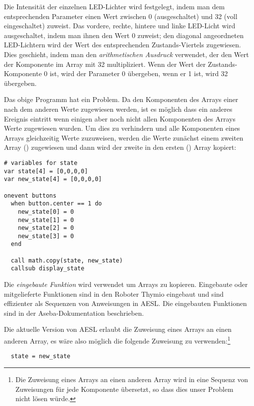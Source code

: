 Die Intensität der einzelnen LED-Lichter wird festgelegt, indem man dem entsprechenden Parameter einen Wert zwischen 0 (ausgeschaltet) und 32 (voll eingeschaltet) zuweist. Das vordere, rechte, hintere und linke LED-Licht wird ausgeschaltet, indem man ihnen den Wert 0 zuweist; den diagonal angeordneten LED-Lichtern wird der Wert des entsprechenden Zustands-Viertels zugewiesen. Dies geschieht, indem man den \emph{arithmetischen Ausdruck}  verwendet, der den Wert der Komponente im Array mit 32 multipliziert. Wenn der Wert der Zustands-Komponente 0 ist, wird der Parameter 0 übergeben, wenn er 1 ist, wird 32 übergeben. 

\newpage


Das obige Programm hat ein Problem. Da den Komponenten des Arrays  einer nach dem anderen Werte zugewiesen werden, ist es möglich dass ein anderes Ereignis eintritt wenn einigen aber noch nicht allen Komponenten des Arrays Werte zugewiesen wurden. Um dies zu verhindern und alle Komponenten eines Arrays gleichzeitig Werte zuzuweisen, werden die Werte zunächst einem zweiten Array () zugewiesen und dann wird der zweite in den ersten () Array kopiert:

\begin{footnotesize}
\begin{verbatim}
# variables for state
var state[4] = [0,0,0,0]
var new_state[4] = [0,0,0,0]

onevent buttons
  when button.center == 1 do
    new_state[0] = 0
    new_state[1] = 0
    new_state[2] = 0
    new_state[3] = 0
  end

  call math.copy(state, new_state)
  callsub display_state
\end{verbatim}
\end{footnotesize}

Die \emph{eingebaute Funktion}  wird verwendet um Arrays zu kopieren. Eingebaute oder mitgelieferte Funktionen sind in den Roboter Thymio eingebaut und sind effizienter als Sequenzen von Anweisungen in AESL. Die eingebauten Funktionen sind in der Aseba-Dokumentation beschrieben. 

Die aktuelle Version von AESL erlaubt die Zuweisung eines Arrays an einen anderen Array, es wäre also möglich die folgende Zuweisung zu verwenden:\footnote{Die Zuweisung eines Arrays an einen anderen Array wird in eine Sequenz von Zuweisungen für jede Komponente übersetzt, so dass dies unser Problem nicht lösen würde.}

\begin{footnotesize}
\begin{verbatim}
  state = new_state
\end{verbatim}
\end{footnotesize}
